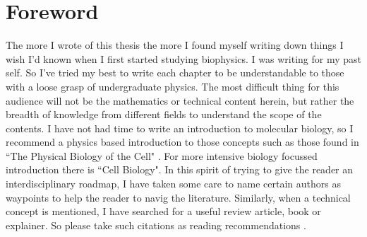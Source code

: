 \chapter*{Foreword}
\label{chap:foreword}
 {}

The more I wrote of this thesis the more I found myself writing down things I wish I'd known when I first started studying biophysics. I was writing for my past self. So I've tried my best to write each chapter to be understandable to those with a loose grasp of undergraduate physics. The most difficult thing for this audience will not be the mathematics or technical content herein, but rather the breadth of knowledge from different fields to understand the scope of the contents. I have not had time to write an introduction to molecular biology, so I recommend a physics based introduction to those concepts such as those found in ``The Physical Biology of the Cell" \cite{phillips2012}. For more intensive biology focussed introduction there is ``Cell Biology"\cite{pollard2016}. In this spirit of trying to give the reader an interdisciplinary roadmap, I have taken some care to name certain authors as waypoints to help the reader to navig the literature. Similarly, when a technical concept is mentioned, I have searched for a useful review article, book or explainer. So please take such citations as reading recommendations \cite{dawkins1989, hofstadter1999}.

